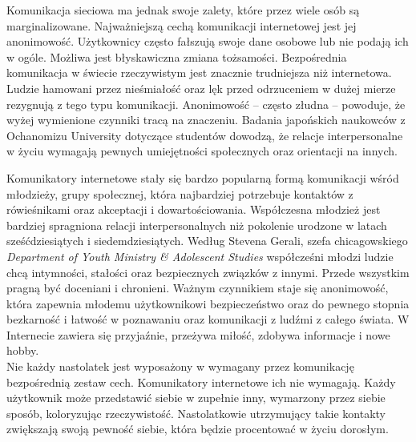 \documentclass[a4paper,12pt]{article}
\begin{document}
\par Komunikacja sieciowa ma jednak swoje zalety, które przez wiele osób są marginalizowane.
Najważniejszą cechą komunikacji internetowej jest jej anonimowość. Użytkownicy często fałszują swoje dane osobowe lub nie podają ich w ogóle. Możliwa jest błyskawiczna zmiana tożsamości. Bezpośrednia komunikacja w świecie rzeczywistym jest znacznie trudniejsza niż internetowa. Ludzie hamowani przez nieśmiałość oraz lęk przed odrzuceniem w dużej mierze rezygnują z tego typu komunikacji. Anonimowość -- często złudna -- powoduje, że wyżej wymienione czynniki tracą na znaczeniu. Badania japońskich naukowców z Ochanomizu University \cite {OU} dotyczące studentów dowodzą, że relacje interpersonalne w życiu wymagają pewnych umiejętności społecznych oraz orientacji na innych.

\par Komunikatory internetowe stały się bardzo popularną formą komunikacji wśród młodzieży, grupy społecznej, która najbardziej potrzebuje kontaktów z rówieśnikami oraz akceptacji i dowartościowania. Współczesna młodzież jest bardziej spragniona relacji interpersonalnych niż pokolenie urodzone w latach sześćdziesiątych i siedemdziesiątych.
Według Stevena Gerali, szefa chicagowskiego \emph{Department of Youth Ministry \& Adolescent Studies} \cite {OU} współcześni młodzi ludzie chcą intymności, stałości oraz bezpiecznych związków z innymi. Przede wszystkim pragną być doceniani i chronieni. Ważnym czynnikiem staje się anonimowość, która zapewnia młodemu użytkownikowi bezpieczeństwo oraz do pewnego stopnia bezkarność i łatwość w poznawaniu oraz komunikacji z ludźmi z całego świata.
W Internecie zawiera się przyjaźnie, przeżywa miłość, zdobywa informacje i nowe hobby.\\
Nie każdy nastolatek jest wyposażony w wymagany przez komunikację bezpośrednią zestaw cech. Komunikatory internetowe ich nie wymagają. Każdy użytkownik może przedstawić siebie w zupełnie inny, wymarzony przez siebie sposób, koloryzując rzeczywistość. Nastolatkowie utrzymujący takie kontakty zwiększają swoją pewność siebie, która będzie procentować w życiu dorosłym.
\end{document}
